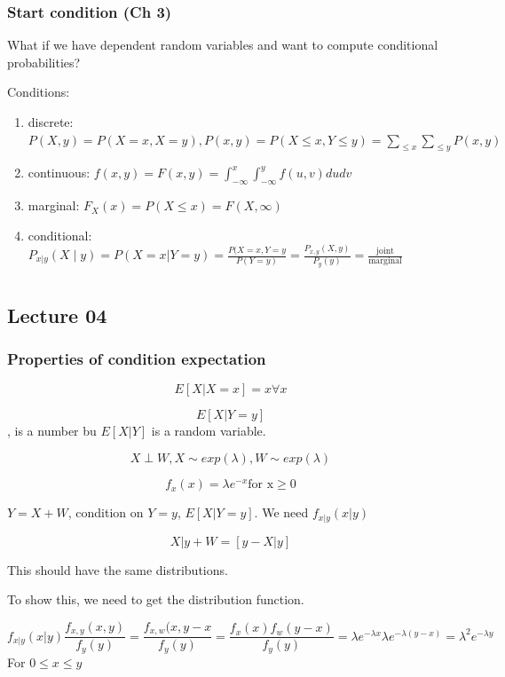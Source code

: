 \documentclass{report}
\begin{document}
\subsection{Start condition (Ch 3)} 
What if we have dependent random variables and want to compute conditional probabilities? 

Conditions:
\begin{enumerate}
	\item discrete: $P(X,y) = P(X=x, X=y), P(x,y) = P(X\le x, Y\le y) = \sum_{\le x}\sum_{\le y} P(x,y)$
	\item continuous: $f(x,y) = F(x,y) = \int_{-\infty}^x \int_{-\infty}^y f(u,v) dudv$
	\item marginal: $F_X(x) = P(X\le x) = F(X,\infty)$ 
	\item conditional: $P_{x|y}(X \mid y) = P(X=x | Y=y) = \frac{P(X=x, Y= y}{P(Y=y)}= \frac{P_{x,y}(X,y)}{P_y(y)} = \frac{\text{joint}}{\text{marginal}}$
\end{enumerate}



\chapter{}
\section{Lecture 04} 
\subsection{Properties of condition expectation} 
\[E[X | X=x] = x \forall x\]


\[E[X|Y=y]\], is a number bu $E[X|Y]$ is a random variable. 

\[X \perp W, X \sim exp(\lambda), W \sim exp(\lambda)\]

\[f_x(x) = \lambda e^{-x} \text{for x} \ge 0\]

$Y= X + W$, condition on $Y=y$, $E[X|Y=y]$. We need $f_{x|y}(x|y)$

\[X| y + W = [y-X | y]\] 

This should have the same distributions. 


To show this, we need to get the distribution function. 

\[f_{x|y}(x|y) \frac{f_{x,y}(x,y)}{f_y(y)} = \frac{f_{x,w}(x, y-x}{f_y(y)} = \frac{f_x(x)f_w(y-x)}{f_y(y)} = \lambda e^{-\lambda x} \lambda e^{-\lambda(y-x)} = \lambda^2 e^{-\lambda y}\]
For $0\le x \le y$ 
\end{document}

